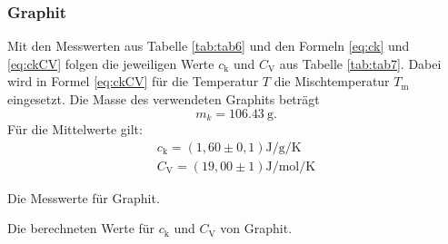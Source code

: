 \subsubsection{Graphit}

Mit den Messwerten aus Tabelle \ref{tab:tab6} und den Formeln \eqref{eq:ck} und \eqref{eq:ckCV} folgen die jeweiligen Werte $c_\text{k}$ und $C_\text{V}$ aus Tabelle \ref{tab:tab7}. Dabei wird in Formel \eqref{eq:ckCV} für die Temperatur $T$ die Mischtemperatur $T_\text{m}$ eingesetzt. Die Masse des verwendeten Graphits beträgt \[m_k = \SI{106,43}{\gram}.\]
Für die Mittelwerte gilt:
\begin{align*}
	c_\text{k} = (1,60\pm0,1)\si{\joule\per\gram\per\kelvin} \\
	C_\text{V} = (19,00\pm1)\si{\joule\per\mol\per\kelvin}
\end{align*}
\begin{table}
	\centering
	\caption{Die Messwerte für Graphit.}
	
	\label{tab:tab6}
\end{table}
\begin{table}
	\centering
	\caption{Die berechneten Werte für $c_\text{k}$ und $C_\text{V}$ von Graphit.}
	
	\label{tab:tab7}
\end{table}


